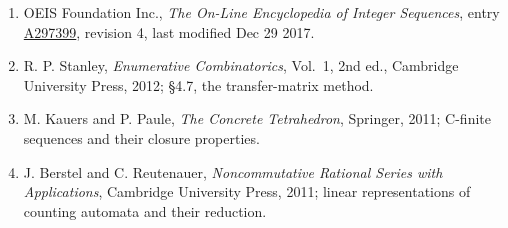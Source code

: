 \documentclass[11pt]{article}
\theoremstyle{definition}
\begin{document}
\begin{enumerate}

\item OEIS Foundation Inc., \emph{The On-Line Encyclopedia of Integer Sequences}, entry \href{https://oeis.org/A297399}{A297399}, revision 4, last modified Dec 29 2017.

\item R. P. Stanley, \emph{Enumerative Combinatorics}, Vol.~1, 2nd ed., Cambridge University Press, 2012; \S4.7, the transfer-matrix method.

\item M. Kauers and P. Paule, \emph{The Concrete Tetrahedron}, Springer, 2011; C-finite sequences and their closure properties.

\item J. Berstel and C. Reutenauer, \emph{Noncommutative Rational Series with Applications}, Cambridge University Press, 2011; linear representations of counting automata and their reduction.

\end{enumerate}
\end{document}
